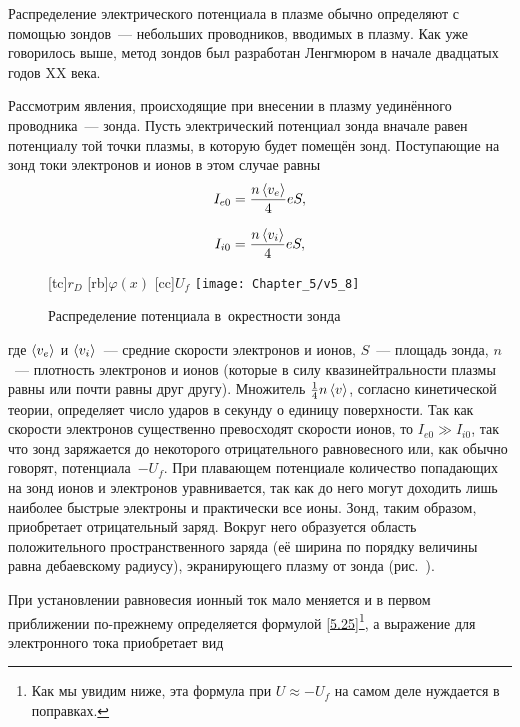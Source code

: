 
Распределение электрического потенциала в плазме обычно определяют с помощью зондов~--- небольших проводников, вводимых в
плазму. Как уже говорилось выше, метод зондов был разработан Ленгмюром в начале двадцатых годов XX века.

Рассмотрим явления, происходящие при внесении в плазму уединённого проводника~--- зонда. Пусть электрический потенциал
зонда вначале равен потенциалу той точки плазмы, в которую будет помещён зонд. Поступающие на зонд токи электронов и
ионов в этом случае равны
\begin{equation}
	\eqmark{5.24}
	I_{e0}=\frac{n\average{v_e}}{4}eS,
\end{equation}

\begin{equation}
	\eqmark{5.25}
	I_{i0}=\frac{n\average{v_i}}{4}eS,
\end{equation}
\begin{wrapfigure}{o}{0.5\textwidth}
	[tc]{$r_D$}
	[rb]{$\varphi(x)$}
	[cc]{$U_f$}
	\texttt{[image: Chapter\_5/v5\_8]}
	\caption{Распределение потенциала в~окрестности зонда}
\end{wrapfigure}
где $\left< v_e \right>$ и $\left< v_i \right>$~--- средние скорости электронов и ионов, $S$~--- площадь зонда, $n$~--- плотность
электронов и ионов (которые в силу квазинейтральности плазмы равны или почти равны друг другу). Множитель $\frac{1}{4}
n\left< v \right>$, согласно кинетической теории, определяет число ударов в секунду о единицу поверхности. Так как скорости
электронов существенно превосходят скорости ионов, то $I_{e0}\gg I_{i0}$, так что зонд заряжается до некоторого
отрицательного равновесного или, как обычно говорят,  потенциала~$-U_f$. При плавающем потенциале
количество попадающих на зонд ионов и электронов уравнивается, так как до него могут доходить лишь наиболее быстрые
электроны и практически все ионы. Зонд, таким образом, приобретает отрицательный заряд. Вокруг него образуется область
положительного пространственного заряда (её ширина по порядку величины равна дебаевскому радиусу), экранирующего плазму
от зонда (рис.~).

При установлении равновесия ионный ток мало меняется и в первом приближении по-прежнему определяется формулой
\eqref{5.25}\footnote{Как мы увидим ниже, эта формула при $U\approx -U_f$ на самом деле нуждается в поправках.}, а
выражение для электронного тока приобретает вид

